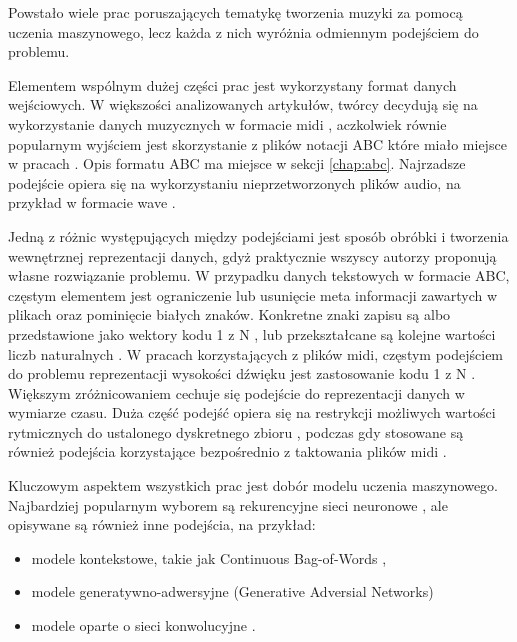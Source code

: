 {{    %
    Powstało wiele prac poruszających tematykę tworzenia muzyki za pomocą uczenia maszynowego, 
    lecz każda z\,\,nich wyróżnia odmiennym podejściem do problemu.

    Elementem wspólnym dużej części prac jest wykorzystany format danych wejściowych.
    W\,\,większości analizowanych artykułów, twórcy decydują się na wykorzystanie 
    danych muzycznych w\,\,formacie midi \cite{Hadjeres2016DeepBachAS, Mogren2016CRNNGANCR, Wu2017AHR, Yang2017MidiNetAC}, 
    aczkolwiek równie popularnym wyjściem jest skorzystanie z\,\,plików notacji ABC które miało miejsce w\,\,pracach \cite{Agarwala2017MusicCU, Sturm2015FolkMS}. 
    Opis formatu ABC ma miejsce w\,\,sekcji \ref{chap:abc}.
    Najrzadsze podejście opiera się na wykorzystaniu nieprzetworzonych plików audio, 
    na przykład w\,\,formacie wave \cite{Oord2016WaveNetAG}.
    
    Jedną z\,\,różnic występujących między podejściami jest sposób obróbki i\,\,tworzenia
    wewnętrznej reprezentacji danych, gdyż praktycznie wszyscy autorzy 
    proponują własne rozwiązanie problemu. 
    W\,\,przypadku danych tekstowych w\,\,formacie ABC, częstym elementem jest ograniczenie
    lub usunięcie meta informacji zawartych w\,\,plikach \cite{Agarwala2017MusicCU, Sturm2015FolkMS} oraz pominięcie białych znaków.
    Konkretne znaki zapisu są albo przedstawione jako wektory kodu 1 z\,\,N \cite{Sturm2015FolkMS}, 
    lub przekształcane są kolejne wartości liczb naturalnych \cite{Agarwala2017MusicCU}.
    W\,\,pracach korzystających z\,\,plików midi, częstym podejściem do problemu reprezentacji wysokości
    dźwięku jest zastosowanie kodu 1 z\,\,N \cite{Yang2017MidiNetAC}. Większym zróżnicowaniem cechuje się podejście
    do reprezentacji danych w\,\,wymiarze czasu. Duża część podejść opiera się na restrykcji możliwych
    wartości rytmicznych do ustalonego dyskretnego zbioru \cite{Hadjeres2016DeepBachAS, Wu2017AHR}, 
    podczas gdy stosowane są również podejścia korzystające bezpośrednio z\,\,taktowania 
    plików midi \cite{Mogren2016CRNNGANCR}.

    Kluczowym aspektem wszystkich prac jest dobór modelu uczenia maszynowego.
    Najbardziej popularnym wyborem są rekurencyjne sieci neuronowe \cite{Agarwala2017MusicCU, Mogren2016CRNNGANCR, Souza2018DeepNN, Sturm2015FolkMS},
    ale opisywane są również inne podejścia, na przykład:
    \begin{itemize}
      \setlength\itemsep{-0.5em}
      \item modele kontekstowe, takie jak Continuous Bag-of-Words \cite{Agarwala2017MusicCU},
      \item modele generatywno-adwersyjne (Generative Adversial Networks) \cite{Agarwala2017MusicCU, Mogren2016CRNNGANCR}
      \item modele oparte o\,\,sieci konwolucyjne \cite{Oord2016WaveNetAG, Yang2017MidiNetAC}.
    \end{itemize}

}}
